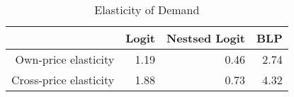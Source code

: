 \begin{table}[ht]
\centering
\caption{Elasticity of Demand} 
\begin{tabular}{rrrr}
  \hline
 & Logit & Nestsed Logit & BLP \\ 
  \hline
Own-price elasticity & 1.19 & 0.46 & 2.74 \\ 
  Cross-price elasticity & 1.88 & 0.73 & 4.32 \\ 
   \hline
\end{tabular}
\end{table}
